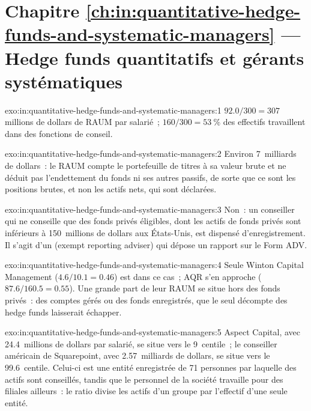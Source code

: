  \section*{Chapitre \ref{ch:in:quantitative-hedge-funds-and-systematic-managers} --- Hedge funds quantitatifs et gérants systématiques}

\begin{solution}{exo:in:quantitative-hedge-funds-and-systematic-managers:1}
$92.0/300=307$ millions de dollars de RAUM par salarié~; $160/300=53~\%$ des effectifs travaillent dans des fonctions de conseil.
\end{solution}

\begin{solution}{exo:in:quantitative-hedge-funds-and-systematic-managers:2}
Environ 7~milliards de dollars~: le RAUM compte le portefeuille de titres à sa valeur brute et ne déduit pas
l'endettement du fonds ni ses autres passifs, de sorte que ce sont les positions brutes, et non les actifs nets, qui sont déclarées.
\end{solution}

\begin{solution}{exo:in:quantitative-hedge-funds-and-systematic-managers:3}
Non~: un conseiller qui ne conseille que des fonds privés éligibles, dont les actifs de fonds privés sont inférieurs à 150~millions de dollars
aux États-Unis, est dispensé d'enregistrement. Il s'agit d'un  (exempt reporting adviser) qui dépose un rapport sur le Form ADV.
\end{solution}

\begin{solution}{exo:in:quantitative-hedge-funds-and-systematic-managers:4}
Seule Winton Capital Management ($4.6/10.1=0.46$) est dans ce cas~; AQR s'en approche ($87.6/160.5=0.55$). Une grande part de leur RAUM se situe hors
des fonds privés~: des comptes gérés ou des fonds enregistrés, que le seul décompte des hedge funds laisserait échapper.
\end{solution}

\begin{solution}{exo:in:quantitative-hedge-funds-and-systematic-managers:5}
Aspect Capital, avec 24.4~millions de dollars par salarié, se situe vers le 9~centile~; le conseiller américain de Squarepoint, avec 2.57~milliards de dollars, se situe vers
le 99.6~centile. Celui-ci est une entité enregistrée de 71 personnes par laquelle des actifs sont conseillés, tandis que le personnel de la société travaille pour des filiales ailleurs~:
le ratio divise les actifs d'un groupe par l'effectif d'une seule entité.
\end{solution}

